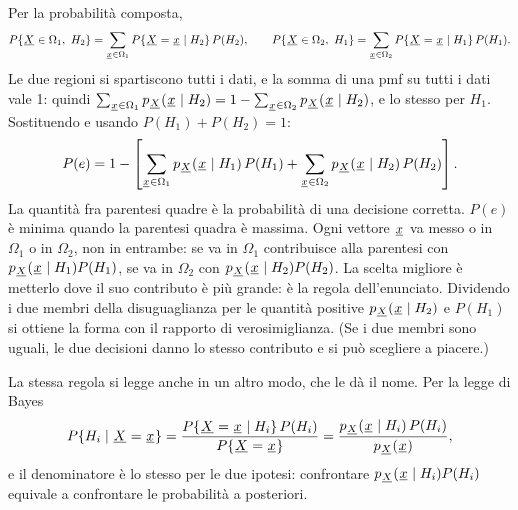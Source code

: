 
\begin{dimostrazione}
 Per la probabilità composta,
\[ P\{{\mkern1mu\underline{X}\mkern1mu} \in \Omega_1,\ H_2\} = \sum_{{\mkern1mu\underline{x}\mkern1mu} \in \Omega_1} P\{{\mkern1mu\underline{X}\mkern1mu} = {\mkern1mu\underline{x}\mkern1mu} \mid H_2\}\, P(H_2) , \qquad
   P\{{\mkern1mu\underline{X}\mkern1mu} \in \Omega_2,\ H_1\} = \sum_{{\mkern1mu\underline{x}\mkern1mu} \in \Omega_2} P\{{\mkern1mu\underline{X}\mkern1mu} = {\mkern1mu\underline{x}\mkern1mu} \mid H_1\}\, P(H_1) . \]
 Le due regioni si spartiscono tutti i dati, e la somma di una pmf su tutti i dati vale
1: quindi $\sum_{{\mkern1mu\underline{x}\mkern1mu} \in \Omega_1} p_{{\mkern1mu\underline{X}\mkern1mu}}({\mkern1mu\underline{x}\mkern1mu} \mid H_2) = 1 - \sum_{{\mkern1mu\underline{x}\mkern1mu} \in \Omega_2}
p_{{\mkern1mu\underline{X}\mkern1mu}}({\mkern1mu\underline{x}\mkern1mu} \mid H_2)$, e lo stesso per $H_1$. Sostituendo e usando $P(H_1) + P(H_2) = 1$:
\[ P(e) = 1 - \left[ \sum_{{\mkern1mu\underline{x}\mkern1mu} \in \Omega_1} p_{{\mkern1mu\underline{X}\mkern1mu}}({\mkern1mu\underline{x}\mkern1mu} \mid H_1)\, P(H_1) + \sum_{{\mkern1mu\underline{x}\mkern1mu} \in
   \Omega_2} p_{{\mkern1mu\underline{X}\mkern1mu}}({\mkern1mu\underline{x}\mkern1mu} \mid H_2)\, P(H_2) \right] . \]
La quantità fra parentesi quadre è la probabilità di una decisione corretta.
 $P(e)$ è minima quando la parentesi quadra è massima. Ogni vettore ${\mkern1mu\underline{x}\mkern1mu}$
va messo o in $\Omega_1$ o in $\Omega_2$, non in entrambe: se va in $\Omega_1$ contribuisce alla parentesi con
$p_{{\mkern1mu\underline{X}\mkern1mu}}({\mkern1mu\underline{x}\mkern1mu} \mid H_1) P(H_1)$, se va in $\Omega_2$ con $p_{{\mkern1mu\underline{X}\mkern1mu}}({\mkern1mu\underline{x}\mkern1mu} \mid H_2) P(H_2)$. La scelta
migliore è metterlo dove il suo contributo è più grande: è la regola dell'enunciato.
 Dividendo i due membri della disuguaglianza per le quantità positive $p_{{\mkern1mu\underline{X}\mkern1mu}}({\mkern1mu\underline{x}\mkern1mu} \mid
H_2)$ e $P(H_1)$ si ottiene la forma con il rapporto di verosimiglianza. (Se i due membri sono uguali, le due decisioni
danno lo stesso contributo e si può scegliere a piacere.)
\end{dimostrazione}

La stessa regola si legge anche in un altro modo, che le dà il nome. Per la legge di Bayes
\[ P\{H_i \mid {\mkern1mu\underline{X}\mkern1mu} = {\mkern1mu\underline{x}\mkern1mu}\} = \frac{P\{{\mkern1mu\underline{X}\mkern1mu} = {\mkern1mu\underline{x}\mkern1mu} \mid H_i\}\, P(H_i)}{P\{{\mkern1mu\underline{X}\mkern1mu} = {\mkern1mu\underline{x}\mkern1mu}\}} =
   \frac{p_{{\mkern1mu\underline{X}\mkern1mu}}({\mkern1mu\underline{x}\mkern1mu} \mid H_i)\, P(H_i)}{p_{{\mkern1mu\underline{X}\mkern1mu}}({\mkern1mu\underline{x}\mkern1mu})} , \]
e il denominatore è lo stesso per le due ipotesi: confrontare $p_{{\mkern1mu\underline{X}\mkern1mu}}({\mkern1mu\underline{x}\mkern1mu} \mid H_i) P(H_i)$ equivale a
confrontare le probabilità a posteriori.

